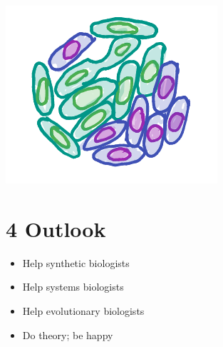 \documentclass[a0,portrait]{a0poster}
\begin{document}
\begin{center}
\includegraphics[width=0.9\linewidth]{competition}
\end{center}
\section*{4 Outlook}
\begin{itemize}
	\item Help synthetic biologists
	\item Help systems biologists
	\item Help evolutionary biologists
	\item Do theory; be happy
\end{itemize}
\vfill\null
\columnbreak
\end{document}
